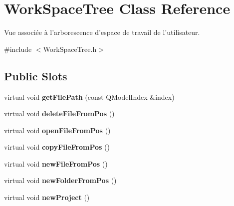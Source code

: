 \hypertarget{class_work_space_tree}{
\section{WorkSpaceTree Class Reference}
\label{class_work_space_tree}
}


Vue associée à l'arborescence d'espace de travail de l'utilisateur.  




{\ttfamily \#include $<$WorkSpaceTree.h$>$}

\subsection*{Public Slots}
\begin{DoxyCompactItemize}
\item 
\hypertarget{class_work_space_tree_a31f4265fe3947c73c01a9617fe851912}{
virtual void {\bfseries getFilePath} (const QModelIndex \&index)}
\label{class_work_space_tree_a31f4265fe3947c73c01a9617fe851912}

\item 
\hypertarget{class_work_space_tree_ae60d3bf98003f4373ade684acffc0238}{
virtual void {\bfseries deleteFileFromPos} ()}
\label{class_work_space_tree_ae60d3bf98003f4373ade684acffc0238}

\item 
\hypertarget{class_work_space_tree_acd37973fe383b875a000d7948ff20b98}{
virtual void {\bfseries openFileFromPos} ()}
\label{class_work_space_tree_acd37973fe383b875a000d7948ff20b98}

\item 
\hypertarget{class_work_space_tree_ab19aaf49843abe29c25c5db67c2d0953}{
virtual void {\bfseries copyFileFromPos} ()}
\label{class_work_space_tree_ab19aaf49843abe29c25c5db67c2d0953}

\item 
\hypertarget{class_work_space_tree_abc891cf420bd366f4e61837587942dc8}{
virtual void {\bfseries newFileFromPos} ()}
\label{class_work_space_tree_abc891cf420bd366f4e61837587942dc8}

\item 
\hypertarget{class_work_space_tree_a793cad745bbe4e0bde2598f6035b774c}{
virtual void {\bfseries newFolderFromPos} ()}
\label{class_work_space_tree_a793cad745bbe4e0bde2598f6035b774c}

\item 
\hypertarget{class_work_space_tree_ab5991e72f47f5a490b9f24649b8bbcbf}{
virtual void {\bfseries newProject} ()}
\label{class_work_space_tree_ab5991e72f47f5a490b9f24649b8bbcbf}


\end{DoxyCompactItemize}
